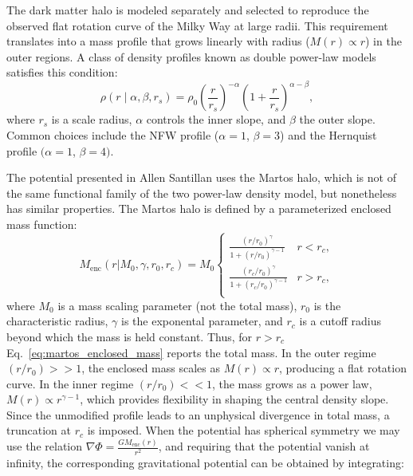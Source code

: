         The dark matter halo is modeled separately and selected to reproduce the observed flat rotation curve of the Milky Way at large radii. This requirement translates into a mass profile that grows linearly with radius ($M(r) \propto r$) in the outer regions. A class of density profiles known as double power-law models satisfies this condition:
        \begin{equation}
            \rho(r \mid \alpha, \beta, r_s) = \rho_0 \left( \frac{r}{r_s} \right)^{-\alpha} \left(1 + \frac{r}{r_s} \right)^{\alpha - \beta},
        \end{equation}
        where $r_s$ is a scale radius, $\alpha$ controls the inner slope, and $\beta$ the outer slope. Common choices include the NFW profile ($\alpha = 1$, $\beta = 3$) and the Hernquist profile $(\alpha = 1$, $\beta = 4)$.

        The potential presented in Allen Santillan uses the Martos halo, which is not of the same functional family of the two power-law density model, but nonetheless has similar properties. The Martos halo is defined by a parameterized enclosed mass function:
        \begin{equation} 
            M_{\mathrm{enc}}(r|M_0,\gamma,r_0,r_c) = M_0
            \begin{cases}
             \frac{\left(r/r_0\right)^\gamma}{1 + \left(r/r_0\right)^{\gamma - 1}} & r<r_c,\\
             \frac{\left(r_c/r_0\right)^\gamma}{1 + \left(r_c/r_0\right)^{\gamma - 1}} & r> r_c,\\
            \end{cases} 
            \label{eq:martos_enclosed_mass}
        \end{equation}
        where $M_0$ is a mass scaling parameter (not the total mass), $r_0$ is the characteristic radius, $\gamma$ is the exponental parameter, and $r_c$ is a cutoff radius beyond which the mass is held constant. Thus, for $r > r_c$ Eq.~\ref{eq:martos_enclosed_mass} reports the total mass. In the outer regime $(r/r_0) >> 1$, the enclosed mass scales as $M(r) \propto r$, producing a flat rotation curve. In the inner regime $(r/r_0) << 1$, the mass grows as a power law, $M(r) \propto r^{\gamma - 1}$, which provides flexibility in shaping the central density slope. Since the unmodified profile leads to an unphysical divergence in total mass, a truncation at $r_c$ is imposed. When the potential has spherical symmetry we may use the relation $\nabla \Phi = \frac{G M_{\mathrm{enc}}(r)}{r^2}$, and requiring that the potential vanish at infinity, the corresponding gravitational potential can be obtained by integrating:


